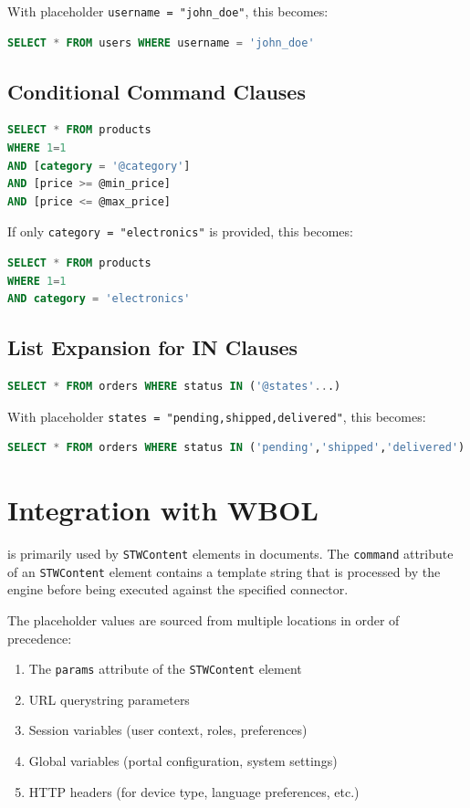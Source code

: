 With placeholder \texttt{username = "john\_doe"}, this becomes:
\begin{lstlisting}[language=SQL]
SELECT * FROM users WHERE username = 'john_doe'
\end{lstlisting}

\subsection{Conditional Command Clauses}

\begin{lstlisting}[language=SQL,caption={WBPL Conditional Blocks}]
SELECT * FROM products 
WHERE 1=1 
AND [category = '@category'] 
AND [price >= @min_price] 
AND [price <= @max_price]
\end{lstlisting}

If only \texttt{category = "electronics"} is provided, this becomes:
\begin{lstlisting}[language=SQL]
SELECT * FROM products 
WHERE 1=1 
AND category = 'electronics'
\end{lstlisting}

\subsection{List Expansion for IN Clauses}

\begin{lstlisting}[language=SQL,caption={WBPL List Expansion}]
SELECT * FROM orders WHERE status IN ('@states'...)
\end{lstlisting}

With placeholder \texttt{states = "pending,shipped,delivered"}, this becomes:
\begin{lstlisting}[language=SQL]
SELECT * FROM orders WHERE status IN ('pending','shipped','delivered')
\end{lstlisting}

\section{Integration with WBOL}
\label{sec:wbpl-integration}

\wbpl{} is primarily used by \texttt{STWContent} elements in \wbol{} documents. The \texttt{command} attribute of an \texttt{STWContent} element contains a template string that is processed by the \wbpl{} engine before being executed against the specified connector.

The placeholder values are sourced from multiple locations in order of precedence:
\begin{enumerate}
\item The \texttt{params} attribute of the \texttt{STWContent} element
\item URL querystring parameters
\item Session variables (user context, roles, preferences)
\item Global variables (portal configuration, system settings)
\item HTTP headers (for device type, language preferences, etc.)
\end{enumerate}

